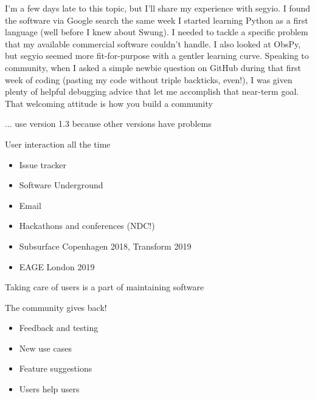 \documentclass[pdf]{beamer}
\begin{document}
\begin{frame}
    \begin{displayquote}
        I'm a few days late to this topic, but I'll share my experience with segyio. I
        found the software via Google search the same week I started learning
        Python as a first language (well before I knew about Swung). I needed
        to tackle a specific problem that my available commercial software
        couldn't handle. I also looked at ObsPy, but segyio seemed more
        fit-for-purpose with a gentler learning curve. Speaking to community,
        when I asked a simple newbie question on GitHub during that first week
        of coding (pasting my code without triple backticks, even!), I was
        given plenty of helpful debugging advice that let me accomplish that
        near-term goal. That welcoming attitude is how you build a community
    \end{displayquote}
\end{frame}

\begin{frame}
    \begin{displayquote}
        ... use version 1.3 because other versions have problems
    \end{displayquote}
\end{frame}

\begin{frame}
    User interaction all the time
    \begin{itemize}
        \item Issue tracker
        \item Software Underground
        \item Email
        \item Hackathons and conferences (NDC!)
        \item Subsurface Copenhagen 2018, Transform 2019
        \item EAGE London 2019
    \end{itemize}

    Taking care of users is a part of maintaining software
\end{frame}

\begin{frame}
    The community gives back!

    \begin{itemize}
        \item Feedback and testing
        \item New use cases
        \item Feature suggestions
        \item Users help users
    \end{itemize}
\end{frame}
\end{document}
